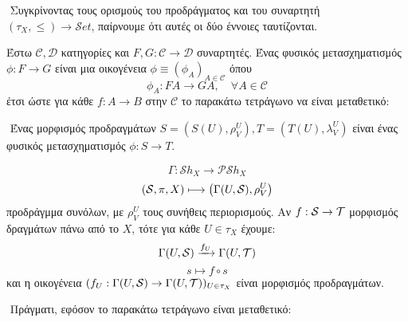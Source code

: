$ $\newline
Συγκρίνοντας τους ορισμούς του προδράγματος και του συναρτητή $(\tau_X, \leq) \rightarrow \mathcal{S}et$, παίρνουμε ότι αυτές οι δύο έννοιες ταυτίζονται.





\begin{defn} Έστω $\mathcal{C},\mathcal{D}$ κατηγορίες και $F,G : \mathcal{C} \rightarrow \mathcal{D}$ συναρτητές. Ένας φυσικός μετασχηματισμός $\phi : F \rightarrow G$ είναι μια οικογένεια $\phi \equiv (\phi_A)_{A\in \mathcal{C}}$ όπου
    $$\phi_A: FA \rightarrow GA,\quad \forall A \in \mathcal{C}$$ έτσι ώστε για κάθε $f:A\rightarrow B$ στην $\mathcal{C}$ το παρακάτω τετράγωνο να είναι μεταθετικό:
\end{defn}
\begin{figure}[H]
    \centering
\end{figure}

$ $\newline
Ένας μορφισμός προδραγμάτων $S = (S(U),\rho^U_V), T = (T(U),\lambda^U_V)$ είναι ένας φυσικός μετασχηματισμός $\phi :S \rightarrow T$.





\begin{defn}
    $$\Gamma: \mathcal{S}h_X \longrightarrow \mathcal{P}\mathcal{S}h_X$$
$$(\mathcal{S}, \pi, X) \longmapsto \left(\Gamma(U,\mathcal{S}),\rho^U_V\right)$$ προδράγμμα συνόλων, με $\rho^U_V$ τους συνήθεις περιορισμούς. Αν $f:\mathcal{S} \rightarrow \mathcal{T}$ μορφισμός δραγμάτων πάνω από το $X$, τότε για κάθε $U\in \tau_X$ έχουμε:
$$\Gamma(U,\mathcal{S}) \xrightarrow[]{f_U} \Gamma(U,\mathcal{T})$$
$$s\longmapsto f\circ s$$ και η οικογένεια $(f_U: \Gamma(U,\mathcal{S}) \rightarrow \Gamma(U,\mathcal{T}))_{U \in \tau_X}$ είναι μορφισμός προδραγμάτων.
\end{defn}

$ $\newline
Πράγματι, εφόσον το παρακάτω τετράγωνο είναι μεταθετικό:
\begin{figure}[H]
    \centering
\end{figure}

